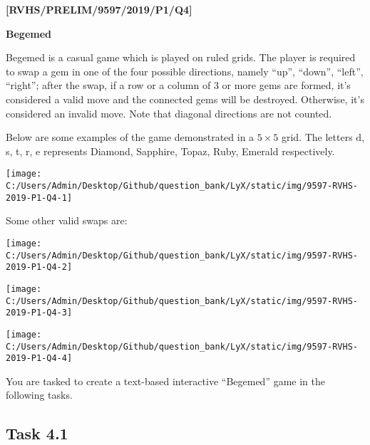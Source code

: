 \item \textbf{{[}RVHS/PRELIM/9597/2019/P1/Q4{]} }

\textbf{Begemed }

Begemed is a casual game which is played on ruled grids. The player
is required to swap a gem in one of the four possible directions,
namely \textquotedblleft up\textquotedblright , \textquotedblleft down\textquotedblright ,
\textquotedblleft left\textquotedblright , \textquotedblleft right\textquotedblright ;
after the swap, if a row or a column of 3 or more gems are formed,
it\textquoteright s considered a valid move and the connected gems
will be destroyed. Otherwise, it\textquoteright s considered an invalid
move. Note that diagonal directions are not counted. 

Below are some examples of the game demonstrated in a $5\times5$
grid. The letters \textquotedbl d\textquotedbl , \textquotedbl s\textquotedbl ,
\textquotedbl t\textquotedbl , \textquotedbl r\textquotedbl ,
\textquotedbl e\textquotedbl{} represents Diamond, Sapphire, Topaz,
Ruby, Emerald respectively. 
\begin{center}
\texttt{[image: C:/Users/Admin/Desktop/Github/question\_bank/LyX/static/img/9597-RVHS-2019-P1-Q4-1]}
\par\end{center}

Some other valid swaps are: 
\begin{center}
\texttt{[image: C:/Users/Admin/Desktop/Github/question\_bank/LyX/static/img/9597-RVHS-2019-P1-Q4-2]}
\par\end{center}

\begin{center}
\texttt{[image: C:/Users/Admin/Desktop/Github/question\_bank/LyX/static/img/9597-RVHS-2019-P1-Q4-3]}
\par\end{center}

\begin{center}
\texttt{[image: C:/Users/Admin/Desktop/Github/question\_bank/LyX/static/img/9597-RVHS-2019-P1-Q4-4]}
\par\end{center}

You are tasked to create a text-based interactive \textquotedblleft Begemed\textquotedblright{}
game in the following tasks. 

\subsection*{Task 4.1 }

